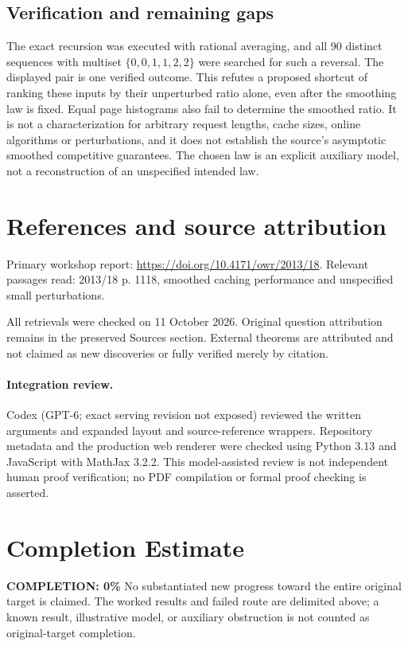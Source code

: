 \documentclass[11pt]{article}
\begin{document}
\subsection{Verification and remaining gaps}
The exact recursion was executed with rational averaging, and all 90 distinct sequences with multiset $\{0,0,1,1,2,2\}$ were searched for such a reversal. The displayed pair is one verified outcome. This refutes a proposed shortcut of ranking these inputs by their unperturbed ratio alone, even after the smoothing law is fixed. Equal page histograms also fail to determine the smoothed ratio. It is not a characterization for arbitrary request lengths, cache sizes, online algorithms or perturbations, and it does not establish the source's asymptotic smoothed competitive guarantees. The chosen law is an explicit auxiliary model, not a reconstruction of an unspecified intended law.

\section{References and source attribution}
Primary workshop report: \url{https://doi.org/10.4171/owr/2013/18}. Relevant passages read: 2013/18 p. 1118, smoothed caching performance and unspecified small perturbations.

All retrievals were checked on 11 October 2026. Original question attribution remains in the preserved Sources section. External theorems are attributed and not claimed as new discoveries or fully verified merely by citation.


\paragraph{Integration review.} Codex (GPT-6; exact serving revision not exposed) reviewed the written arguments and expanded layout and source-reference wrappers. Repository metadata and the production web renderer were checked using Python 3.13 and JavaScript with MathJax 3.2.2. This model-assisted review is not independent human proof verification; no PDF compilation or formal proof checking is asserted.

\section{Completion Estimate}
\noindent\textbf{COMPLETION: 0\%}
No substantiated new progress toward the entire original target is claimed. The worked results and failed route are delimited above; a known result, illustrative model, or auxiliary obstruction is not counted as original-target completion.
\end{document}

